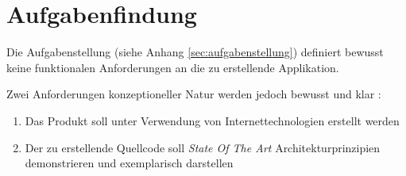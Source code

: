 \chapter{Aufgabenfindung}

Die Aufgabenstellung (siehe Anhang \ref{sec:aufgabenstellung}) definiert bewusst keine funktionalen Anforderungen an die zu erstellende Applikation. 

Zwei Anforderungen konzeptioneller Natur werden jedoch bewusst und klar :

\begin{enumerate}
	\item Das Produkt soll unter Verwendung von Internettechnologien erstellt werden
	\item Der zu erstellende Quellcode soll \emph{State Of The Art} Architekturprinzipien \cite{ROCA} demonstrieren und exemplarisch darstellen
\end{enumerate}



%